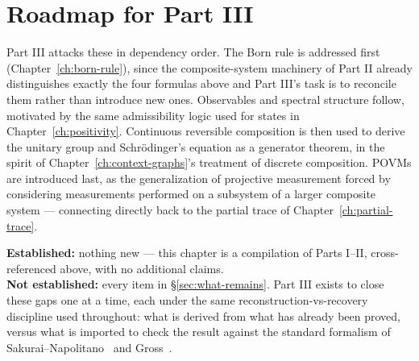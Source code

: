 \section{Roadmap for Part III}

Part III attacks these in dependency order. The Born rule is addressed first
(Chapter~\ref{ch:born-rule}), since the composite-system machinery of Part II
already distinguishes exactly the four formulas above and Part III's task is
to reconcile them rather than introduce new ones. Observables and spectral
structure follow, motivated by the same admissibility logic used for states
in Chapter~\ref{ch:positivity}. Continuous reversible composition is then
used to derive the unitary group and Schrödinger's equation as a generator
theorem, in the spirit of Chapter~\ref{ch:context-graphs}'s treatment of
discrete composition. POVMs are introduced last, as the generalization of
projective measurement forced by considering measurements performed on a
subsystem of a larger composite system — connecting directly back to the
partial trace of Chapter~\ref{ch:partial-trace}.

\begin{ledgerentry}
\textbf{Established:} nothing new — this chapter is a compilation of Parts
I--II, cross-referenced above, with no additional claims.\\
\textbf{Not established:} every item in \S\ref{sec:what-remains}. Part III
exists to close these gaps one at a time, each under the same
reconstruction-vs-recovery discipline used throughout: what is derived from
what has already been proved, versus what is imported to check the result
against the standard formalism of Sakurai--Napolitano~\cite{sakurainapolitano}
and Gross~\cite{gross}.
\end{ledgerentry}
